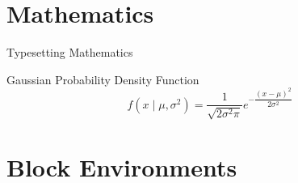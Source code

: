 \documentclass[aspectratio=169, sectionpages]{beamer}
\begin{document}







\section{Mathematics}


\begin{frame}[fragile]{Typesetting Mathematics}
\begin{block}{Gaussian Probability Density Function}
\[
f \left(x \mid \mu, \sigma^2 \right) = \dfrac{1}{\sqrt{2 \sigma^2 \pi}} e^{- \dfrac{(x-\mu)^2}{2\sigma^2}}
\]
\end{block}

\end{frame}



\section{Block Environments}
\end{document}
